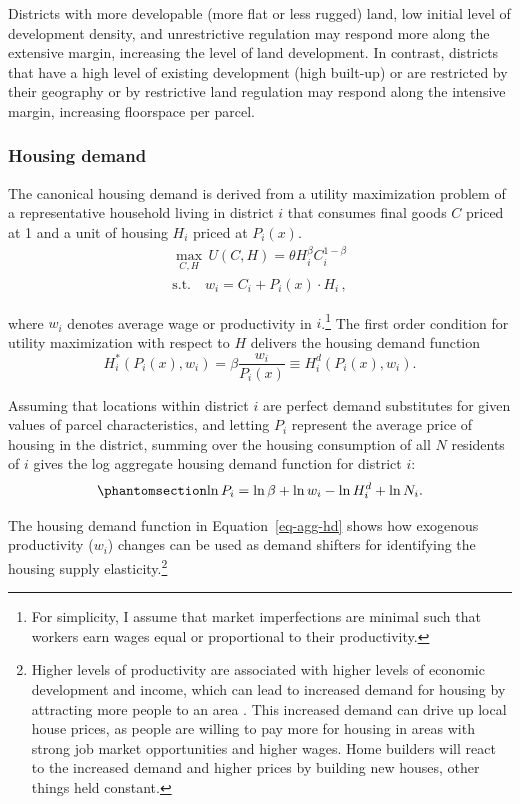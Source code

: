 \documentclass[
  12pt,
]{article}
\begin{document}
Districts with more developable (more flat or less rugged) land, low
initial level of development density, and unrestrictive regulation may
respond more along the extensive margin, increasing the level of land
development. In contrast, districts that have a high level of existing
development (high built-up) or are restricted by their geography or by
restrictive land regulation may respond along the intensive margin,
increasing floorspace per parcel.

\subsubsection{Housing demand}\label{housing-demand}

The canonical housing demand is derived from a utility maximization
problem of a representative household living in district \(i\) that
consumes final goods \(C\) priced at 1 and a unit of housing \(H_i\)
priced at \(P_i(x)\). \[
\begin{aligned}
\underset{C,H}{\max}\, U(C, H) = \theta H_i^\beta C_i^{1-\beta}\\
\text{s.t.}\quad w_i = C_i+P_i(x)\cdot H_i\,,
\end{aligned}
\]

where \(w_i\) denotes average wage or productivity in \(i\).\footnote{For
  simplicity, I assume that market imperfections are minimal such that
  workers earn wages equal or proportional to their productivity.} The
first order condition for utility maximization with respect to \(H\)
delivers the housing demand function \[
H^{*}_i(P_i(x), w_i) = \beta\frac{w_i}{P_i(x)} \equiv H^d_i(P_i(x), w_i).
\]

Assuming that locations within district \(i\) are perfect demand
substitutes for given values of parcel characteristics, and letting
\(P_{i}\) represent the average price of housing in the district,
summing over the housing consumption of all \(N\) residents of \(i\)
gives the log aggregate housing demand function for district \(i\):
\begin{equation}\protect\phantomsection\label{eq-agg-hd}{
\ln P_{i}=\ln \beta + \ln w_{i}-\ln H_{i}^{d} + \ln N_{i}.
}\end{equation}

The housing demand function in Equation~\ref{eq-agg-hd} shows how
exogenous productivity (\(w_i\)) changes can be used as demand shifters
for identifying the housing supply elasticity.\footnote{Higher levels of
  productivity are associated with higher levels of economic development
  and income, which can lead to increased demand for housing by
  attracting more people to an area
  \citep{glaeser_gottlieb_2009, glaeser_2008}. This increased demand can
  drive up local house prices, as people are willing to pay more for
  housing in areas with strong job market opportunities and higher
  wages. Home builders will react to the increased demand and higher
  prices by building new houses, other things held constant.}
\end{document}
